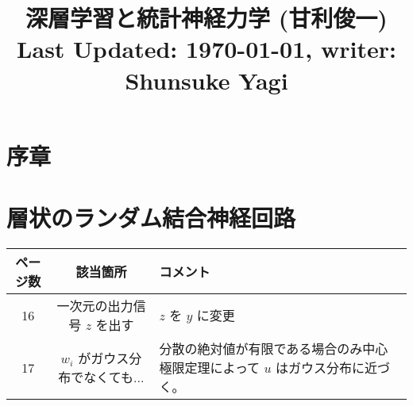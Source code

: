 \documentclass{jsarticle}
\title{深層学習と統計神経力学 (甘利俊一) \\[2ex] \large Last Updated: \today, \quad writer: Shunsuke Yagi}
\author{}
\date{}
\begin{document}
\setcounter{section}{-1}
\maketitle
\section{序章}
\section{層状のランダム結合神経回路}
\begin{table}[H]
  \centering
  \begin{tabular}{|c|c|p{10 cm}|}
      \hline
      ページ数 & 該当箇所 & コメント \\ \hline
      16 & 一次元の出力信号 $z$ を出す & $z$ を $y$ に変更 \\ \hline
      17 & $w_i$ がガウス分布でなくても... & 分散の絶対値が有限である場合のみ中心極限定理によって $u$ はガウス分布に近づく。 \\ \hline
  \end{tabular}
  \label{tab:memo}
\end{table}
\end{document}
